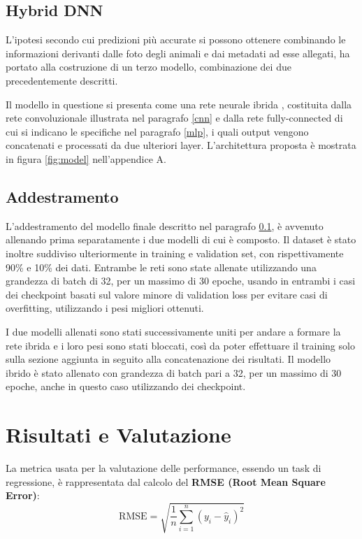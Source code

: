     \subsection{Hybrid DNN}
    \label{mulinput}
    L'ipotesi secondo cui predizioni più accurate si possono ottenere combinando le informazioni derivanti dalle foto degli animali e dai metadati ad esse allegati, ha portato alla
    costruzione di un terzo modello, combinazione dei due precedentemente descritti.

    Il modello in questione si presenta come una rete neurale ibrida \cite{yuan2020hybriddnns}, costituita dalla rete convoluzionale illustrata nel paragrafo \ref{cnn} e dalla rete fully-connected di cui si indicano le specifiche nel paragrafo \ref{mlp}, i quali output vengono concatenati e processati da due ulteriori layer.
    L'architettura proposta è mostrata in figura \ref{fig:model} nell'appendice A.


    \subsection{Addestramento}
    L'addestramento del modello finale descritto nel paragrafo \ref{mulinput}, è avvenuto allenando prima separatamente i due modelli di cui è composto. Il dataset è stato inoltre suddiviso ulteriormente in training e validation set, con rispettivamente 90\% e 10\% dei dati. Entrambe le reti sono state allenate utilizzando una grandezza di batch di 32, per un massimo di 30 epoche, usando in entrambi i casi dei checkpoint basati sul valore minore di validation loss per evitare casi di overfitting, utilizzando i pesi migliori ottenuti. 

    I due modelli allenati sono stati successivamente uniti per andare a formare la rete ibrida e i loro pesi sono stati bloccati, così da poter effettuare il training 
    solo sulla sezione aggiunta in seguito alla concatenazione dei risultati.
    Il modello ibrido è stato allenato con grandezza di batch pari a 32, per un massimo di 30 epoche, anche in questo caso utilizzando dei checkpoint.


\section{Risultati e Valutazione}

La metrica usata per la valutazione delle performance, essendo un task di regressione, è rappresentata dal calcolo del \textbf{RMSE (Root Mean Square Error)}:
\begin{equation}
    \textrm{RMSE} = \sqrt{\frac{1}{n} \sum_{i=1}^{n} (y_i - \hat{y}_i)^2} 
\end{equation}

